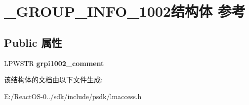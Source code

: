 \hypertarget{struct___g_r_o_u_p___i_n_f_o__1002}{}\section{\+\_\+\+G\+R\+O\+U\+P\+\_\+\+I\+N\+F\+O\+\_\+1002结构体 参考}
\label{struct___g_r_o_u_p___i_n_f_o__1002}
\subsection*{Public 属性}
\begin{DoxyCompactItemize}
\item 
\mbox{\label{struct___g_r_o_u_p___i_n_f_o__1002_a217aa1cd350ad52240e73ad55db668f7}} 
L\+P\+W\+S\+TR {\bfseries grpi1002\+\_\+comment}
\end{DoxyCompactItemize}


该结构体的文档由以下文件生成\+:\begin{DoxyCompactItemize}
\item 
E\+:/\+React\+O\+S-\/0../sdk/include/psdk/lmaccess.\+h\end{DoxyCompactItemize}
